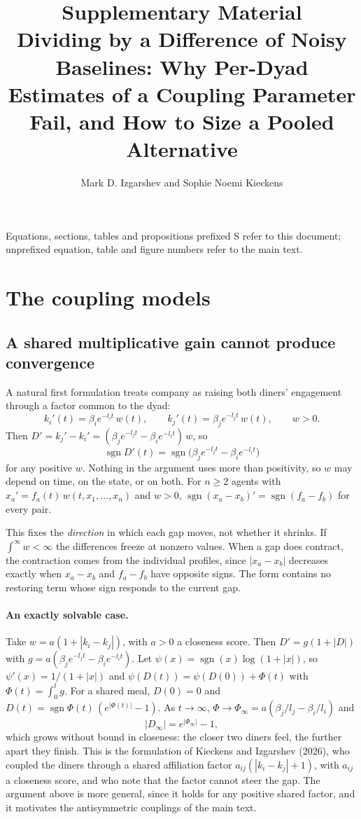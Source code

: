 \documentclass[12pt]{article}
\title{Supplementary Material\\
\large Dividing by a Difference of Noisy Baselines: Why Per-Dyad Estimates of a Coupling Parameter Fail, and How to Size a Pooled Alternative}
\author{Mark D. Izgarshev and Sophie Noemi Kieckens}
\date{}
\theoremstyle{definition}
\newcommand{\ki}{k_i}
\newcommand{\kj}{k_j}
\begin{document}
\maketitle

\noindent Equations, sections, tables and propositions prefixed S refer to this
document; unprefixed equation, table and figure numbers refer to the main text.

\section{The coupling models}

\subsection{A shared multiplicative gain cannot produce convergence}

A natural first formulation treats company as raising both diners' engagement
through a factor common to the dyad:
\begin{equation}\label{eq:shared}
\ki'(t)=\beta_ie^{-l_it}\,w(t),
\qquad
\kj'(t)=\beta_je^{-l_jt}\,w(t),
\qquad w>0.
\end{equation}
Then $D'=\kj'-\ki'=(\beta_je^{-l_jt}-\beta_ie^{-l_it})\,w$, so
\[
\operatorname{sgn}D'(t)=\operatorname{sgn}\bigl(\beta_je^{-l_jt}-\beta_ie^{-l_it}\bigr)
\]
for any positive $w$. Nothing in the argument uses more than positivity, so $w$ may
depend on time, on the state, or on both. For $n\ge2$ agents with
$x_a'=f_a(t)\,w(t,x_1,\ldots,x_n)$ and $w>0$,
$\operatorname{sgn}(x_a-x_b)'=\operatorname{sgn}(f_a-f_b)$ for every pair.

This fixes the \emph{direction} in which each gap moves, not whether it shrinks.
If $\int^\infty w<\infty$ the differences freeze at nonzero values. When a gap does
contract, the contraction comes from the individual profiles, since $|x_a-x_b|$
decreases exactly when $x_a-x_b$ and $f_a-f_b$ have opposite signs. The form
contains no restoring term whose sign responds to the current gap.

\paragraph{An exactly solvable case.} Take $w=a(1+|\ki-\kj|)$, with $a>0$ a
closeness score. Then $D'=g(1+|D|)$ with
$g=a(\beta_je^{-l_jt}-\beta_ie^{-l_it})$. Let
$\psi(x)=\operatorname{sgn}(x)\log(1+|x|)$, so $\psi'(x)=1/(1+|x|)$ and
$\psi(D(t))=\psi(D(0))+\Phi(t)$ with $\Phi(t)=\int_0^tg$. For a shared meal,
$D(0)=0$ and $D(t)=\operatorname{sgn}\Phi(t)\,(e^{|\Phi(t)|}-1)$. As $t\to\infty$,
$\Phi\to\Phi_\infty=a(\beta_j/l_j-\beta_i/l_i)$ and
\[
|D_\infty|=e^{|\Phi_\infty|}-1,
\]
which grows without bound in closeness: the closer two diners feel, the further
apart they finish. This is the formulation of Kieckens and Izgarshev (2026), who
coupled the diners through a shared affiliation factor
$a_{ij}(|\ki-\kj|+1)$, with $a_{ij}$ a closeness score, and who note that the factor
cannot steer the gap. The argument above is more general, since it holds for any
positive shared factor, and it motivates the antisymmetric couplings of the main
text.
\end{document}
